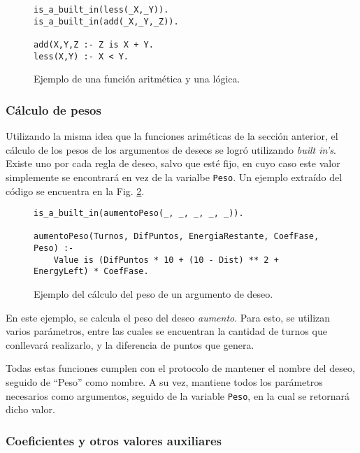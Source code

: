\documentclass[oneside]{book}
\begin{document}
\begin{figure}
\begin{verbatim}    
is_a_built_in(less(_X,_Y)).
is_a_built_in(add(_X,_Y,_Z)).

add(X,Y,Z :- Z is X + Y.
less(X,Y) :- X < Y.
\end{verbatim}

\caption{Ejemplo de una función aritmética y una lógica.}
\label{fig:funciones}
\end{figure}

\subsubsection{Cálculo de pesos}

Utilizando la misma idea que la funciones ariméticas de la sección anterior, el
cálculo de los pesos de los argumentos de deseos se logró utilizando \textit{built 
in's}. Existe uno por cada regla de deseo, salvo que esté fijo, en cuyo caso 
este valor simplemente se encontrará en vez de la varialbe \texttt{Peso}. Un 
ejemplo extraído del código se encuentra en la Fig. \ref{fig:calculoDePeso}.

\begin{figure}
\begin{verbatim}
is_a_built_in(aumentoPeso(_, _, _, _, _)).

aumentoPeso(Turnos, DifPuntos, EnergiaRestante, CoefFase, Peso) :-
    Value is (DifPuntos * 10 + (10 - Dist) ** 2 + EnergyLeft) * CoefFase.
\end{verbatim}

\caption{Ejemplo del cálculo del peso de un argumento de deseo.}
\label{fig:calculoDePeso}
\end{figure}

En este ejemplo, se calcula el peso del deseo \emph{aumento}. Para esto, se utilizan
varios parámetros, entre las cuales se encuentran la cantidad de turnos que 
conllevará realizarlo, y la diferencia de puntos que genera.

Todas estas funciones cumplen con el protocolo de mantener el nombre del deseo,
seguido de ``Peso'' como nombre. A su vez, mantiene todos los parámetros 
necesarios como argumentos, seguido de la variable \texttt{Peso}, en la cual se 
retornará dicho valor.

\subsubsection{Coeficientes y otros valores auxiliares}
\end{document}
